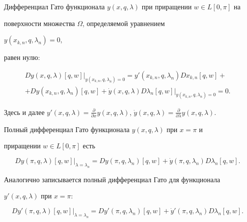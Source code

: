 \begin{pf} 


Дифференциал Гато функционала $y(x,q,\lambda)$ при приращении $w\in 


L[0,\pi]$ на 


поверхности множества $\Omega$, определяемой уравнением 


$y(x_{k,n},q,\lambda_n)=0$, 


равен нулю: 


\begin{multline} 


D y(x,q,\lambda)[q,w]|_{y(x_{k,n},q,\lambda_n)=0}= 


y'(x_{k,n},q,\lambda_n)D x_{k,n}[q,w]+ \\


+D y(x_{k,n},q,\lambda_n)[q,w]+\Dot y(x,q,\lambda) 


D\lambda_n[q,w]|_{y(x_{k,n},q,\lambda_n)=0}=0. 


\end{multline} 


Здесь и далее $y'(x,q,\lambda)=\frac{\partial}{\partial 


x}y(x,q,\lambda)$, $\Dot y(x,q,\lambda)=\frac{\partial}{\partial 


\lambda}y(x,q,\lambda)$. 


Полный дифференциал Гато функционала $y(x,q,\lambda)$ при $x=\pi$ и 


приращении $w\in L[0,\pi]$ есть 


\begin{equation} 


D y(\pi,q,\lambda)[q,w]|_{\lambda=\lambda_n}= 


D y(\pi,q,\lambda_n)[q,w]+\Dot y(\pi,q,\lambda_n) 


D\lambda_n[q,w]. 


\end{equation} 


Аналогично записывается полный дифференциал Гато для функционала 


$y'(x,q,\lambda)$ при $x=\pi$: 


\begin{equation} 


D y'(\pi,q,\lambda)[q,w]|_{\lambda=\lambda_n}= 


D y'(\pi,q,\lambda_n)[q,w]+\Dot y'(\pi,q,\lambda_n) 


D\lambda_n[q,w]. 


\end{equation} 



\end{pf}
